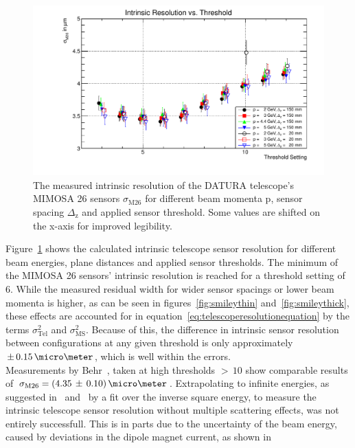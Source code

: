 \begin{figure}[hbtp]
\centering

\includegraphics[width=\textwidth]{figures/resi_thresh_errors.pdf}
\caption[Telescope intrinsic sensor resolution for different threshold settings,
beam momenta and geometries]{The measured intrinsic resolution of the DATURA
telescope's MIMOSA 26 sensors $\sigma_{\textrm{M26}}$ for different beam momenta
p, sensor spacing $\Delta_{\textrm{z}}$ and applied sensor threshold. Some
values are shifted on the x-axis for improved legibility.}
\label{fig:resivsenergy}
\end{figure}

Figure~\ref{fig:resivsenergy} shows the calculated intrinsic telescope sensor
resolution for different beam energies, plane distances and applied sensor
thresholds. The minimum of the MIMOSA 26 sensors' intrinsic resolution is
reached for a threshold setting of $6$. While the measured residual width for
wider sensor spacings or lower beam momenta is higher, as can be seen in
figures~\ref{fig:smileythin} and~\ref{fig:smileythick}, these effects are
accounted for in equation~\ref{eq:telescoperesolutionequation} by the terms
$\sigma_{\textrm{Tel}}^2$ and $\sigma_{\textrm{MS}}^2$. Because of this, the
difference in intrinsic sensor resolution between configurations at any given
threshold is only approximately $\pm\,0.15\,\micro\meter$, which is well within
the errors.\\


Measurements by Behr~\cite{ref:j.behrmeasurements}, taken at high thresholds
$>\,10$ show comparable results of $\sigma_{\textrm{M26}} =
(4.35\,\pm\,0.10)\,\micro\meter$. Extrapolating to infinite energies, as
suggested in~\cite{ref:cmosbeamtest} and~\cite{ref:moritzthesis} by a fit over
the inverse square energy, to measure the intrinsic telescope sensor resolution
without multiple scattering effects, was not entirely successfull. This is in
parts due to the uncertainty of the beam energy, caused by deviations in the
dipole magnet current, as shown in~\cite{ref:summerstudentbrm}\\

